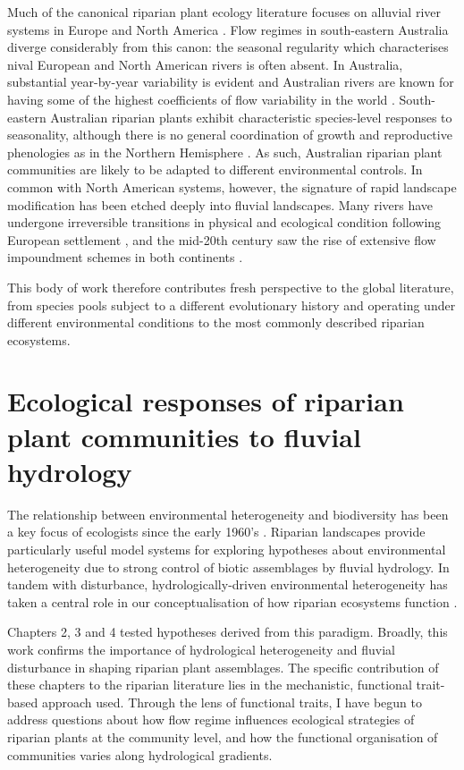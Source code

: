 Much of the canonical riparian plant ecology literature focuses on alluvial river systems in Europe and North America \citep{Nilsson1989, Naiman1997, Tabacchi1998, Naiman2005, Corenblit2007}. Flow regimes in south-eastern Australia diverge considerably from this canon: the seasonal regularity which characterises nival European and North American rivers is often absent. In Australia, substantial year-by-year variability is evident and Australian rivers are known for having some of the highest coefficients of flow variability in the world \citep{Peel2004, Rustomji2009}. South-eastern Australian riparian plants exhibit characteristic species-level responses to seasonality, although there is no general coordination of growth and reproductive phenologies as in the Northern Hemisphere \citep{Ford1979}. As such, Australian riparian plant communities are likely to be adapted to different environmental controls. In common with North American systems, however, the signature of rapid landscape modification has been etched deeply into fluvial landscapes. Many rivers have undergone irreversible transitions in physical and ecological condition following European settlement \citep{Knopf1988, Fleischner1994, Wasson1994, Brierley1999}, and the mid-20th century saw the rise of extensive flow impoundment schemes in both continents \citep{Lloyd2004, Graf2006}.

This body of work therefore contributes fresh perspective to the global literature, from species pools subject to a different evolutionary history and operating under different environmental conditions to the most commonly described riparian ecosystems.

\section{Ecological responses of riparian plant communities to fluvial hydrology}
The relationship between environmental heterogeneity and biodiversity has been a key focus of ecologists since the early 1960’s \citep{MacArthur1961, Stein2014}. Riparian landscapes provide particularly useful model systems for exploring hypotheses about environmental heterogeneity due to strong control of biotic assemblages by fluvial hydrology. In tandem with disturbance, hydrologically-driven environmental heterogeneity has taken a central role in our conceptualisation of how riparian ecosystems function \citep{Poff1997, Naiman2005}.

Chapters 2, 3 and 4 tested hypotheses derived from this paradigm. Broadly, this work confirms the importance of hydrological heterogeneity and fluvial disturbance in shaping riparian plant assemblages. The specific contribution of these chapters to the riparian literature lies in the mechanistic, functional trait-based approach used. Through the lens of functional traits, I have begun to address questions about how flow regime influences ecological strategies of riparian plants at the community level, and how the functional organisation of communities varies along hydrological gradients.


